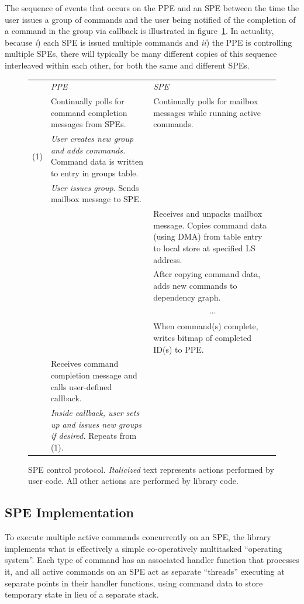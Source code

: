 The sequence of events that occurs on the PPE and an SPE between the time the user issues a group of commands and the user being notified of the completion of a command in the group via callback is illustrated in figure~\ref{fig:lib:control}. In actuality, because \emph{i}) each SPE is issued multiple commands and \emph{ii}) the PPE is controlling multiple SPEs, there will typically be many different copies of this sequence interleaved within each other, for both the same and different SPEs.

\begin{figure}[!htb]
\begin{center}
\begin{tabular}{rp{2.5in}p{2.5in}}
& \emph{PPE} & \emph{SPE} \\
\cline{2-3}
& Continually polls for command completion messages from SPEs. & Continually polls for mailbox messages while running active commands. \\
\cline{2-3}
\textsf{(1)} & \emph{User creates new group and adds commands.} Command data is written to entry in groups table. & \\
& \emph{User issues group.} Sends mailbox message to SPE. & \\
& & Receives and unpacks mailbox message. Copies command data (using DMA) from table entry to local store at specified LS address. \\
& & After copying command data, adds new commands to dependency graph. \\
& & \multicolumn{1}{c}{$\cdots$} \\
& & When command(s) complete, writes bitmap of completed ID(s) to PPE. \\
& Receives command completion message and calls user-defined callback. & \\
& \emph{Inside callback, user sets up and issues new groups if desired.} Repeats from \textsf{(1)}. &
\end{tabular}
\end{center}
\caption[SPE control protocol.]{SPE control protocol. \emph{Italicized} text represents actions performed by user code. All other actions are performed by library code.}
\label{fig:lib:control}
\end{figure}

\subsection{SPE Implementation}

To execute multiple active commands concurrently on an SPE, the library implements what is effectively a simple co-operatively multitasked ``operating system''. Each type of command has an associated handler function that processes it, and all active commands on an SPE act as separate ``threads'' executing at separate points in their handler functions, using command data to store temporary state in lieu of a separate stack.

